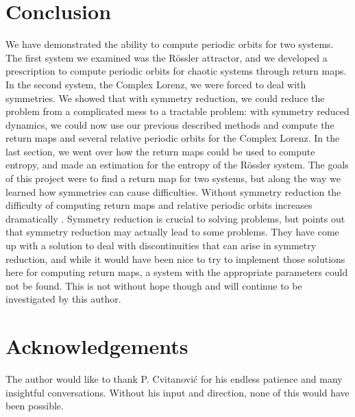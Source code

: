 \documentclass[aip,cha,reprint,
secnumarabic,
nofootinbib, tightenlines,
nobibnotes, showkeys, showpacs,
groupedaddress
]{revtex4-1}
\begin{document}
\section{Conclusion}
We have demonstrated the ability to compute periodic orbits for two systems.  The first system we examined was the R\"ossler attractor, and we developed a prescription to compute periodic orbits for chaotic systems through return maps.  In the second system, the Complex Lorenz, we were forced to deal with symmetries.  We showed that with symmetry reduction, we could reduce the problem from a complicated mess to a tractable problem: with symmetry reduced dynamics, we could now use our previous described methods and compute the return maps and several relative periodic orbits for the Complex Lorenz.  In the last section, we went over how the return maps could be used to compute entropy, and made an estimation for the entropy of the R\"ossler system.  The goals of this project were to find a return map for two systems, but along the way we learned how symmetries can cause difficulties.  Without symmetry reduction the difficulty of computing return maps and relative periodic orbits increases dramatically \cite{Eth}.  Symmetry reduction is crucial to solving problems, but \cite{Atl} points out that symmetry reduction may actually lead to some problems.  They have come up with a solution to deal with discontinuities that can arise in symmetry reduction, and while it would have been nice to try to implement those solutions here for computing return maps, a system with the appropriate parameters could not be found.  This is not without hope though and will continue to be investigated by this author.

\section{Acknowledgements}
The author would like to thank P. Cvitanovi\'c for his endless patience and many insightful conversations.  Without his input and direction, none of this would have been possible.
\end{document}
